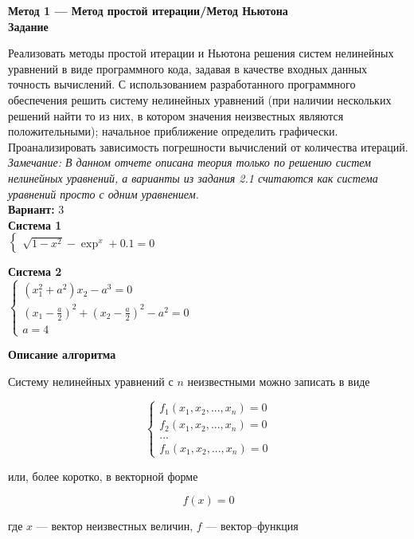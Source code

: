 \textbf{Метод 1 --- Метод простой итерации/Метод Ньютона}\\

\textbf{Задание}

Реализовать методы простой итерации и Ньютона решения систем нелинейных уравнений в виде программного кода, задавая в качестве входных данных точность вычислений. С использованием разработанного программного обеспечения решить систему нелинейных уравнений (при наличии нескольких решений найти то из них, в котором значения неизвестных являются положительными); начальное приближение определить графически. Проанализировать зависимость погрешности вычислений от количества итераций.\\

\textit{Замечание: В данном отчете описана теория только по решению систем нелинейных уравнений, а варианты из задания 2.1 считаются как система уравнений просто с одним уравнением.}\\

\textbf{Вариант:} 3\\

\textbf{Система 1}\\

$
\begin{cases}
\sqrt{1-x^2}-\exp^x+0.1=0
\end{cases}
$
\vspace{0.5cm}

\textbf{Система 2}\\

$
\begin{cases}
(x_1^2+a^2)x_2-a^3=0\\
(x_1-\frac{a}{2})^2+(x_2-\frac{a}{2})^2-a^2=0\\
a=4
\end{cases}
$
\vspace{0.5cm}

\textbf{Описание алгоритма}

Систему нелинейных уравнений с $n$ неизвестными можно записать в виде

$$
\begin{cases}
f_1(x_1,x_2,...,x_n)=0\\
f_2(x_1,x_2,...,x_n)=0\\
...\\
f_n(x_1,x_2,...,x_n)=0
\end{cases}
$$

или, более коротко, в векторной форме

$$
f(x)=0
$$

где $x$ --- вектор неизвестных величин, $f$ --- вектор--функция

